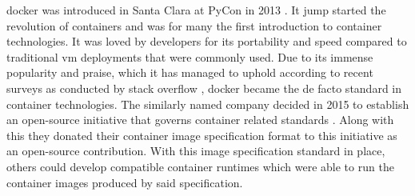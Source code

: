 \Gls{docker} was introduced in Santa Clara at PyCon in 2013 \cite{pycon2013}. It jump started the revolution of \glspl{container} and was for many the first introduction to \gls{container} technologies. It was loved by developers for its portability and speed compared to traditional \gls{vm} deployments that were commonly used. Due to its immense popularity and praise, which it has managed to uphold according to recent surveys as conducted by stack overflow \cite{stack-overflow-survey}, \gls{docker} became the de facto standard in \gls{container} technologies. The similarly named company decided in 2015 to establish an open-source initiative that governs \gls{container} related standards \cite{open-container-standard}. Along with this they donated their container image specification format \cite{open-container-standard-image-spec} to this initiative as an open-source contribution. With this image specification standard in place, others could develop compatible container runtimes which were able to run the container images produced by said specification.
